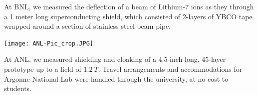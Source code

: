 \documentclass[landscape,a0paper,fontscale=0.290]{baposter} %
\begin{document}
\begin{poster}
{At BNL, we measured the deflection of a beam of Lithium-7 ions as they through a 1 meter long superconducting shield, which consisted of 2-layers of YBCO tape wrapped around a section of stainless steel beam pipe.

\begin{center}
\texttt{[image: ANL-Pic\_crop.JPG]}
\end{center}

At ANL, we measured shielding and cloaking of a 4.5-inch long, 45-layer prototype up to a field of $1.2~T$. Travel arrangements and accommodations for Argonne National Lab were handled through the university, at no cost to students.

}









\end{poster}
\end{document}
